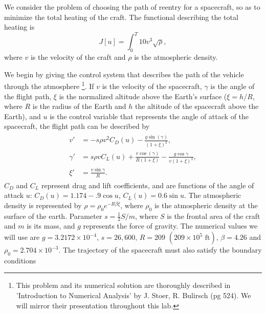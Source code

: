 \label{lab:reentry}



We consider the problem of choosing the path of reentry for a spacecraft, so as to minimize the total heating of the craft. 
The functional describing the total heating is \[
J[u] = \int_0^T 10v^3 \sqrt{\rho}
,\]
where $v$ is the velocity of the craft and $\rho$ is the atmospheric density. 

We begin by giving the control system that describes the path of the vehicle through the atmosphere
\footnote{This problem and its numerical solution are thoroughly described in 'Introduction to Numerical Analysis' by J. Stoer, R. Bulirsch (pg 524). 
We will mirror their presentation throughout this lab.}. 
If $v$ is the velocity of the spacecraft, $\gamma$ is the angle of the flight path, $\xi$ is the normalized altitude above the Earth's surface ($\xi = h/R$, where $R$ is the radius of the Earth and $h$ the altitude of the spacecraft above the Earth), and $u$ is the control variable that represents the angle of attack of the spacecraft, the flight path can be described by 
\begin{align}
\begin{split}
v' &= -s\rho v^2C_D(u) - \frac{g\sin(\gamma)}{(1+\xi)^2},\\
\gamma ' &= s \rho v C_L(u) + \frac{v \cos(\gamma)}{R(1+\xi)} - \frac{g \cos \gamma}{v(1+\xi)^2},\\
\xi' &= \frac{v \sin \gamma}{R}.
\end{split} \label{eqn:reentry:control_system}
\end{align}
$C_D$ and $C_L$ represent drag and lift coefficients, and are functions of the angle of attack $u$: $C_D(u) = 1.174 - .9\cos u$, $C_L(u) = 0.6\sin u$. 
The atmospheric density is represented by $\rho = \rho_0e^{-R\beta\xi}$, where  $\rho_0$ is the atmospheric density at the surface of the earth. 
Parameter $s = \frac{1}{2}S/m$, where $S$ is the frontal area of the craft and $m$ is its mass, and $g$ represents the force of gravity. 
The numerical values we will use are $g = 3.2172\times10^{-4}$, $s = 26,600$, $R = 209$ $(209\times 10^5 \text{ ft})$, $\beta = 4.26$ and $\rho_0 = 2.704\times 10^{-3}$.
The trajectory of the spacecraft must also satisfy the boundary conditions
